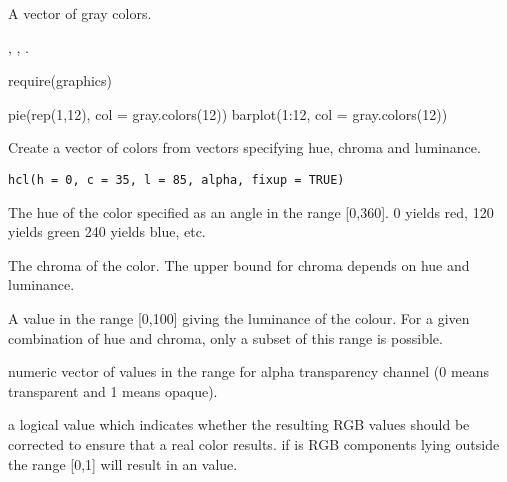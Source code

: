 %
\begin{Value}
A vector of  gray colors.
\end{Value}
%
\begin{SeeAlso}\relax
{},
,
.
\end{SeeAlso}
%
\begin{Examples}
\begin{ExampleCode}
require(graphics)

pie(rep(1,12), col = gray.colors(12))
barplot(1:12, col = gray.colors(12))
\end{ExampleCode}
\end{Examples}
%
\begin{Description}\relax
Create a vector of colors from vectors specifying hue,
chroma and luminance.
\end{Description}
%
\begin{Usage}
\begin{verbatim}
hcl(h = 0, c = 35, l = 85, alpha, fixup = TRUE)
\end{verbatim}
\end{Usage}
%
\begin{Arguments}
\begin{ldescription}
\item[\code{h}] The hue of the color specified as an angle in the range
[0,360].  0 yields red, 120 yields green 240 yields blue, etc.
\item[\code{c}] The chroma of the color.  The upper bound for chroma depends
on hue and luminance.
\item[\code{l}] A value in the range [0,100] giving the luminance of the
colour.  For a given combination of hue and chroma, only
a subset of this range is possible.
\item[\code{alpha}] numeric vector of values in the range \code{[0,1]} for
alpha transparency channel (0 means transparent and 1 means opaque).
\item[\code{fixup}] a logical value which indicates whether the resulting
RGB values should be corrected to ensure that a real color results.
if  is  RGB components lying outside the
range [0,1] will result in an  value.
\end{ldescription}
\end{Arguments}
%
